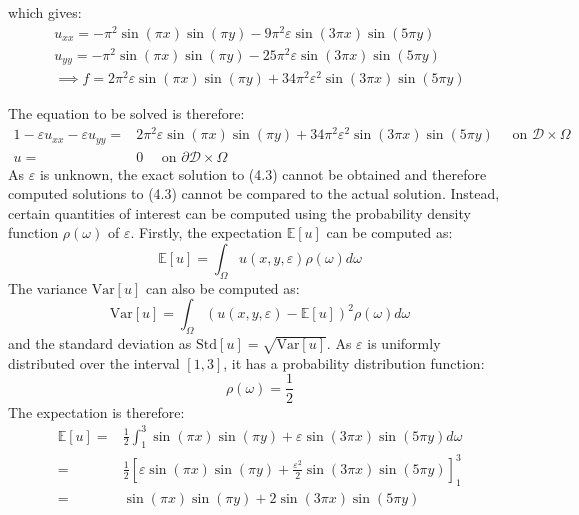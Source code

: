 \documentclass[11pt]{article}
\numberwithin{equation}{section}
\begin{document}
which gives:
\begin{equation}
\begin{split}
u_{xx} = -\pi^2 \sin(\pi x) \sin(\pi y) - 9\pi^2 \varepsilon \sin(3\pi x) \sin(5\pi y) \\
u_{yy} = -\pi^2 \sin(\pi x) \sin(\pi y) - 25\pi^2 \varepsilon \sin(3\pi x) \sin(5\pi y) \\
\implies f = 2\pi^2 \varepsilon \sin(\pi x) \sin(\pi y) + 34\pi^2 \varepsilon^2 \sin(3\pi x) \sin(5\pi y)
\end{split}
\end{equation}

The equation to be solved is therefore:
\begin{alignat}{1}
- \varepsilon u_{xx} - \varepsilon u_{yy} = {} & 2\pi^2 \varepsilon \sin(\pi x) \sin(\pi y)+ 34 \pi^2 \varepsilon^2 \sin(3 \pi x) \sin(5 \pi y) \quad \text{ on } \mathcal{D} \times \Omega \nonumber \\
u = {} & 0 \quad \text{ on } \partial \mathcal{D} \times \Omega
\end{alignat}
As $\varepsilon$ is unknown, the exact solution to (4.3) cannot be obtained and therefore computed solutions to (4.3) cannot be compared to the actual solution. Instead, certain quantities of interest can be computed using the probability density function $\rho(\omega)$ of $\varepsilon$. Firstly, the expectation $\mathbb{E}[u]$ can be computed as:
\begin{equation}
\mathbb{E}[u] = \int_{\Omega} u(x,y,\varepsilon) \rho(\omega) d \omega
\end{equation}
The variance $\text{Var}[u]$ can also be computed as:
\begin{equation}
\text{Var}[u] = \int_{\Omega} \left(u(x,y,\varepsilon) - \mathbb{E}[u] \right)^2 \rho(\omega) d \omega
\end{equation}
and the standard deviation as $\text{Std}[u] = \sqrt{\text{Var}[u]}$. As $\varepsilon$ is uniformly distributed over the interval $[1,3]$, it has a probability distribution function:
\begin{equation}
\rho(\omega) = \frac{1}{2}
\end{equation}
The expectation is therefore:
\begin{equation}
\begin{split}
\mathbb{E}[u] = & \frac{1}{2} \int_{1}^3 \sin(\pi x)\sin(\pi y) + \varepsilon \sin(3 \pi x) \sin(5 \pi y) d \omega \\
= & \frac{1}{2} \left[\varepsilon \sin(\pi x) \sin(\pi y) + \frac{\varepsilon^2}{2} \sin(3 \pi x) \sin(5 \pi y)\right]_{1}^{3} \\
= & \sin(\pi x) \sin(\pi y) + 2 \sin(3\pi x)\sin(5\pi y)
\end{split}
\end{equation}
\end{document}

